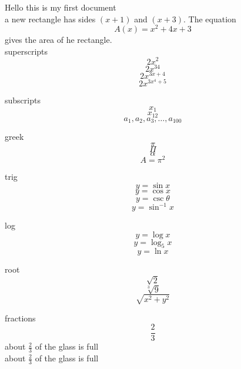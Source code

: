 \documentclass[18px]{article}
\begin{document}
Hello this is my first document\\

a new rectangle has sides $(x + 1)$ and $(x + 3)$.
The equation $${A(x) = x^2 + 4x + 3}$$ gives the area of he rectangle.\\


superscripts 
$$2x^2$$
$$2x^{34}$$
$$2x^{3x + 4}$$
$$2x^{3x^4 + 5}$$

subscripts
$$x_1$$
$$x_{12}$$
$$a_1, a_2, a_3, \ldots, a_{100}$$

greek
$$\pi$$
$$\Pi$$
$$\alpha$$
$$A = \pi ^2$$

trig
$$y = \sin x$$
$$y = \cos x$$
$$y = \csc \theta$$
$$y = \sin ^{-1} x$$

log
$$y = \log x$$
$$y = \log_5 x$$
$$y = \ln x $$

root
$$\sqrt{2}$$
$$\sqrt[3]{9}$$
$$\sqrt{x^2 + y^2}$$

fractions
$$\frac{2}{3}$$
about $\frac{2}{3}$ of the glass is full\\[6pt]
about $\displaystyle \frac{2}{3}$ of the glass is full
\end{document}
